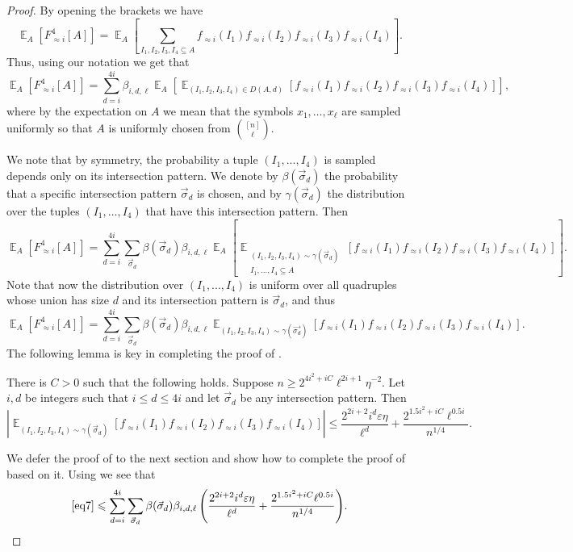 \documentclass{toc}
\newcommand\card[1]{\left| {#1} \right|}
\newcommand\Expect[2]{{\mathop{\mathbb{E}}_{#1}\left[ {#2} \right]}}
\newcommand\eps{\varepsilon}
\renewcommand\geq{\geqslant}
\renewcommand\leq{\leqslant}
\newcommand\approxlvlfn[2]{{#1}_{\approx{#2}}}
\begin{document}
\begin{proof}
By opening the brackets we have
\[
\Expect{A}{\approxlvlfn{F}{i}^4[A]}
=\Expect{A}{
\sum\limits_{I_1,I_2,I_3,I_4\subseteq A}
{
\approxlvlfn{f}{i}(I_1)\approxlvlfn{f}{i}(I_2)\approxlvlfn{f}{i}(I_3)\approxlvlfn{f}{i}(I_4)
}
}.
\]
Thus, using our %
notation  %
we get that
\[
\Expect{A}{\approxlvlfn{F}{i}^4[A]}
=\sum\limits_{d=i}^{4i}{\beta_{i,d,\ell}
\Expect{A}{\Expect{(I_1,I_2,I_3,I_4)\in D(A,d)}{
\approxlvlfn{f}{i}(I_1)\approxlvlfn{f}{i}(I_2)\approxlvlfn{f}{i}(I_3)\approxlvlfn{f}{i}(I_4)
}}},
\]
where by the expectation on $A$ we mean that the symbols $x_1,\ldots,x_{\ell}$ are sampled uniformly so that $A$ is uniformly chosen from $\binom{[n]}{\ell}$.
%


We note that by symmetry, the probability a tuple $(I_1,...,I_4)$ is sampled depends only
on its intersection pattern. We denote by $\beta(\vec{\sigma}_d)$ the probability that a
specific intersection pattern $\vec{\sigma}_d$ is chosen, and by $\gamma(\vec{\sigma}_d)$
the distribution over the tuples $(I_1,\ldots,I_4)$ that have this intersection pattern.
Then
\begin{equation}\label{eq7}
\Expect{A}{\approxlvlfn{F}{i}^4[A]}
=
\sum\limits_{d=i}^{4i}{
\sum\limits_{\vec{\sigma}_d}{
\beta(\vec{\sigma}_d)\beta_{i,d,\ell}
\Expect{A}{\Expect{\substack{(I_1,I_2,I_3,I_4) \sim \gamma(\vec{\sigma}_d)\\ I_1,...,I_4\subseteq A}}
{\approxlvlfn{f}{i}(I_1)\approxlvlfn{f}{i}(I_2)\approxlvlfn{f}{i}(I_3)\approxlvlfn{f}{i}(I_4)
}}}}.
\end{equation}
Note that now the distribution over $(I_1,...,I_4)$ is uniform over all quadruples whose union has size
$d$ and its intersection pattern is $\vec{\sigma}_d$, and thus
\[
\Expect{A}{\approxlvlfn{F}{i}^4[A]}
=\sum\limits_{d=i}^{4i}{
\sum\limits_{\vec{\sigma}_d}{
\beta(\vec{\sigma}_d)\beta_{i,d,\ell}
\Expect{(I_1,I_2,I_3,I_4) \sim \gamma(\vec{\sigma_d})}{
\approxlvlfn{f}{i}(I_1)\approxlvlfn{f}{i}(I_2)\approxlvlfn{f}{i}(I_3)\approxlvlfn{f}{i}(I_4)
}}}.
\]
The following lemma is key in completing the proof of .
\begin{lemma}\label{lem:fourth_core}
There is $C>0$ such that the following holds. Suppose $n\geq 2^{4i^2+iC} \ell^{2i+1}\eta^{-2}$.
Let $i,d$ be integers such that $i\leq d\leq 4i$ and let $\vec{\sigma}_d$ be any intersection pattern.
Then
\[
\card{
\Expect{(I_1,I_2,I_3,I_4) \sim \gamma(\vec{\sigma}_d)}{
\approxlvlfn{f}{i}(I_1)\approxlvlfn{f}{i}(I_2)\approxlvlfn{f}{i}(I_3)\approxlvlfn{f}{i}(I_4)
}}
\leq
\frac{2^{2i+2} i^{d} \eps\eta}{\ell^{d}}+\frac{2^{1.5i^2+iC} \ell^{0.5i}}{n^{1/4}}.
\]
\end{lemma}
We defer the proof of  to the next section and show how to complete the proof of 
based on it. Using  we see that
\[
\eqref{eq7}
\leq
\sum\limits_{d=i}^{4i}{
\sum\limits_{\vec{\sigma}_d}{
\beta(\vec{\sigma}_d)\beta_{i,d,\ell}
\left(
\frac{2^{2i+2} i^{d} \eps\eta}{\ell^{d}}+\frac{2^{1.5i^2+iC} \ell^{0.5i}}{n^{1/4}}
\right)
}}.
\]


\end{proof}
\end{document}
